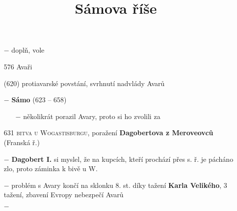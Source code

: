 \documentclass{article}
\title{\vspace{-2cm}Sámova říše\vspace{-1.7cm}}
\date{}
\author{}
\begin{document}
\maketitle
\begin{itemize}
    \vspace{-0.5em}
    \setlength\itemsep{0.15em}
    \item[$-$] doplň, vole
    \item[576] Avaři
    \item[(620)] protiavarské povstání, svrhnutí nadvlády Avarů
    \item[$-$] \textbf{Sámo} (623 -- 658)
        \begin{itemize}
            \vspace{-0.5em}
            \setlength\itemsep{0.15em}
            \item[$-$] několikrát porazil Avary, proto si ho zvolili za 
        \end{itemize}
    \item[631] \textsc{bitva u Wogastisburgu}, poražení \textbf{Dagobertova z Meroveovců} (Franská ř.)
    \item[$-$] \textbf{Dagobert I.} si myslel, že na kupcích, kteří prochází přes s. ř. je pácháno zlo, proto záminka k bivě u W.
    \item[$-$] problém s Avary končí na sklonku 8. st. díky tažení \textbf{Karla Velikého}, 3 tažení, zbavení Evropy nebezpečí Avarů
    \item[$-$]  
\end{itemize}
\end{document}
